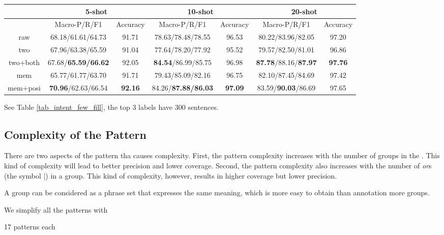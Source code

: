 \begin{table*}
\setlength{\tabcolsep}{0.23em}
\centering
\small{
\begin{tabular}{|c|c|c|c|c|c|c|}

\hline
  & \multicolumn{2}{|c|}{5-shot} & \multicolumn{2}{|c|}{10-shot} & \multicolumn{2}{|c|}{20-shot}  \\
 \hline
  & Macro-P/R/F1 & Accuracy & Macro-P/R/F1 & Accuracy  & Macro-P/R/F1 & Accuracy   \\
\hline
raw & 68.18/61.61/64.73 & 91.71 & 78.63/78.48/78.55 & 96.53 & 80.22/83.96/82.05 & 97.20 \\
\hline
two & 67.96/63.38/65.59 & 91.04 & 77.64/78.20/77.92 & 95.52 & 79.57/82.50/81.01 & 96.86 \\
\hline
two+both & 67.68/\textbf{65.59/66.62} & 92.05 & \textbf{84.54}/86.99/85.75 & 96.98 & \textbf{87.78}/88.16/\textbf{87.97} & \textbf{97.76} \\
\hline
mem & 65.77/61.77/63.70 & 91.71 & 79.43/85.09/82.16 & 96.75 & 82.10/87.45/84.69 & 97.42 \\
\hline
mem+posi & \textbf{70.96}/62.63/66.54 & \textbf{92.16} & 84.26/\textbf{87.88/86.03} & \textbf{97.09} & 83.59/\textbf{90.03}/86.69 & 97.65 \\
\hline

\end{tabular}
}
\caption{Intent Detection Result on Few-Shot Data with the Top 3 Intents Having 300 Sentences.}
\label{tab_intent_few_fill}
\end{table*}
See Table \ref{tab_intent_few_fill}, the top 3 labels have 300 sentences.


\subsection{Complexity of the Pattern}
There are two aspects of the pattern tha causes complexity. First, the pattern complexity increases with the number of groups in the \RE. This kind of complexity will lead to better precision and lower coverage. Second, the pattern complexity also increases with the number of \emph{or}s (the symbol |) in a group. This kind of complexity, however, results in higher coverage but lower precision. 

A group can be considered as a phrase set that expresses the same meaning, which is more easy to obtain than annotation more groups.

We simplify all the patterns with 

17 patterns each





